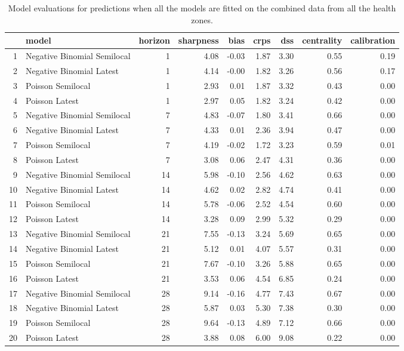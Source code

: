 \begin{table}[ht]
\centering
\begin{tabular}{rlrrrrrrr}
  \hline
 & model & horizon & sharpness & bias & crps & dss & centrality & calibration \\ 
  \hline
1 & Negative Binomial Semilocal &   1 & 4.08 & -0.03 & 1.87 & 3.30 & 0.55 & 0.19 \\ 
  2 & Negative Binomial Latest &   1 & 4.14 & -0.00 & 1.82 & 3.26 & 0.56 & 0.17 \\ 
  3 & Poisson Semilocal &   1 & 2.93 & 0.01 & 1.87 & 3.32 & 0.43 & 0.00 \\ 
  4 & Poisson Latest &   1 & 2.97 & 0.05 & 1.82 & 3.24 & 0.42 & 0.00 \\ 
  5 & Negative Binomial Semilocal &   7 & 4.83 & -0.07 & 1.80 & 3.41 & 0.66 & 0.00 \\ 
  6 & Negative Binomial Latest &   7 & 4.33 & 0.01 & 2.36 & 3.94 & 0.47 & 0.00 \\ 
  7 & Poisson Semilocal &   7 & 4.19 & -0.02 & 1.72 & 3.23 & 0.59 & 0.01 \\ 
  8 & Poisson Latest &   7 & 3.08 & 0.06 & 2.47 & 4.31 & 0.36 & 0.00 \\ 
  9 & Negative Binomial Semilocal &  14 & 5.98 & -0.10 & 2.56 & 4.62 & 0.63 & 0.00 \\ 
  10 & Negative Binomial Latest &  14 & 4.62 & 0.02 & 2.82 & 4.74 & 0.41 & 0.00 \\ 
  11 & Poisson Semilocal &  14 & 5.78 & -0.06 & 2.52 & 4.54 & 0.60 & 0.00 \\ 
  12 & Poisson Latest &  14 & 3.28 & 0.09 & 2.99 & 5.32 & 0.29 & 0.00 \\ 
  13 & Negative Binomial Semilocal &  21 & 7.55 & -0.13 & 3.24 & 5.69 & 0.65 & 0.00 \\ 
  14 & Negative Binomial Latest &  21 & 5.12 & 0.01 & 4.07 & 5.57 & 0.31 & 0.00 \\ 
  15 & Poisson Semilocal &  21 & 7.67 & -0.10 & 3.26 & 5.88 & 0.65 & 0.00 \\ 
  16 & Poisson Latest &  21 & 3.53 & 0.06 & 4.54 & 6.85 & 0.24 & 0.00 \\ 
  17 & Negative Binomial Semilocal &  28 & 9.14 & -0.16 & 4.77 & 7.43 & 0.67 & 0.00 \\ 
  18 & Negative Binomial Latest &  28 & 5.87 & 0.03 & 5.30 & 7.38 & 0.30 & 0.00 \\ 
  19 & Poisson Semilocal &  28 & 9.64 & -0.13 & 4.89 & 7.12 & 0.66 & 0.00 \\ 
  20 & Poisson Latest &  28 & 3.88 & 0.08 & 6.00 & 9.08 & 0.22 & 0.00 \\ 
   \hline
\end{tabular}
\caption{Model evaluations for predictions when all the models are fitted on the combined data from all the health zones.} 
\label{tab:nat_evo}
\end{table}
